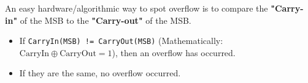 \begin{theorem}
An easy hardware/algorithmic way to spot overflow is to compare the \textbf{"Carry-in"} of the MSB to the \textbf{"Carry-out"} of the MSB.
\begin{itemize}
    \item If \texttt{CarryIn(MSB) != CarryOut(MSB)} (Mathematically: $\text{CarryIn} \oplus \text{CarryOut} = 1$), then an overflow has occurred.
    \item If they are the same, no overflow occurred.
\end{itemize}
\end{theorem}
